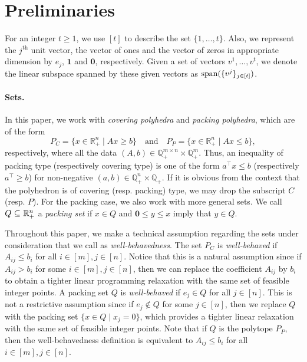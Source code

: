 \documentclass[11pt]{article}
\newcommand{\R}{\mathbb{R}}
\newcommand{\Q}{\mathbb{Q}}
\newcommand{\ones}{\boldsymbol{1}}
\newcommand{\zeros}{\boldsymbol{0}}
\newcommand{\cred}{\color{black}}
\def\spann{\mathop{\rm span}}
\begin{document}
\section{Preliminaries}
\label{sec:Prelim}
For an integer $t \geq 1$, we use $[t]$ to describe the set $\{1, \dots, t\}$. Also, we represent the $j^{\text{th}}$ unit vector, the vector of ones and the vector of zeros in appropriate dimension by $e_j$, $\ones$ and $\zeros$, respectively. Given a set of vectors $v^1, \hdots, v^t$, we denote the linear subspace spanned by these given vectors as $\spann ( \{ v^j \}_{j \in [t]} )$.

\paragraph{Sets.} In this paper, we work with \emph{covering {\cred polyhedra}} and \emph{packing {\cred polyhedra}}, which are of the form 
$$P_C = \{x \in \R^n_+ \mid Ax \ge b \} \quad \text{and} \quad P_P = \{x \in \R^n_+ \mid Ax \le b \},$$
respectively, where all the data $(A,b) \in \Q_+^{m \times n} \times \Q_+^m$. {\cred Thus, an inequality of packing type (respectively covering type) is one of the form $a^\top x \le b$ (respectively $a^\top \ge b$) for non-negative $(a,b) \in \Q_+^n \times \Q_+$.} If it is obvious from the context that the polyhedron is of covering (resp. packing) type, we may drop the subscript $C$ (resp. $P$). For the packing case, we also work with more general sets. We call $Q \ {\cred \subseteq} \ \R_+^n$ a \emph{packing set} if $x \in Q$ and $\zeros \leq y \leq x$ imply that $y \in Q$. 

Throughout this paper, we make a technical assumption regarding the sets under consideration that we call as \emph{well-behavedness}. The set $P_C$ is \emph{well-behaved} if $A_{ij} \leq b_i$ for all $i \in [m], j \in [n]$. Notice that this is a natural assumption since if $A_{ij} > b_i$ for some $i \in [m], j \in [n]$, then we can replace the coefficient $A_{ij}$ by $b_i$ to obtain a tighter linear programming relaxation with the same set of feasible integer points. A packing set $Q$ is \emph{well-behaved} if $e_j \in Q$ for all $j \in [n]$. This is not a restrictive assumption since if $e_j \notin Q$ for some $j \in [n]$, then we replace $Q$ with the packing set $\{ x \in Q \mid x_j = 0\}$, which provides a tighter linear relaxation with the same set of feasible integer points. Note that if $Q$ is the polytope $P_P$, then {\cred the} well-behavedness definition is equivalent to $A_{ij} \leq b_i$ for all $i \in [m], j \in [n]$.
\end{document}
